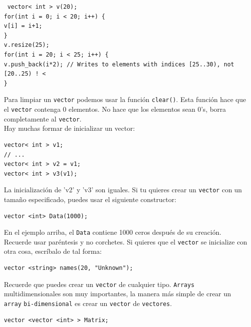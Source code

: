 \documentclass[a4paper,12pt]{article}
\begin{document}
\begin{lstlisting}
 vector< int > v(20);
for(int i = 0; i < 20; i++) {
v[i] = i+1;
}
v.resize(25);
for(int i = 20; i < 25; i++) {
v.push_back(i*2); // Writes to elements with indices [25..30), not [20..25) ! <
}
\end{lstlisting}
Para limpiar un \texttt{vector} podemos usar la función \texttt{clear()}. Esta función hace que el \texttt{vector} contenga 0 elementos. No hace que los elementos sean 0's, borra completamente al \texttt{vector}.\\
Hay muchas formar de inicializar un vector:
\begin{lstlisting}
vector< int > v1;
// ...
vector< int > v2 = v1;
vector< int > v3(v1);
\end{lstlisting}
La inicialización de 'v2' y 'v3' son iguales. Si tu quieres crear un \texttt{vector} con un tamaño especificado, puedes usar el siguiente constructor:
\begin{lstlisting}
vector <int> Data(1000);
\end{lstlisting}
En el ejemplo arriba, el \texttt{Data} contiene 1000 ceros después de su creación. Recuerde usar paréntesis y no corchetes. Si quieres que el \texttt{vector} se inicialize con otra cosa, escríbalo de tal forma:
\begin{lstlisting}
vector <string> names(20, "Unknown");
\end{lstlisting}
Recuerde que puedes crear un \texttt{vector} de cualquier tipo. \texttt{Arrays} multidimensionales son muy importantes, la manera más simple de crear un \texttt{array} \texttt{bi-dimensional} es crear un \texttt{vector} de \texttt{vectores}.
\begin{lstlisting}
vector <vector <int> > Matrix;
\end{lstlisting} 
\end{document}
